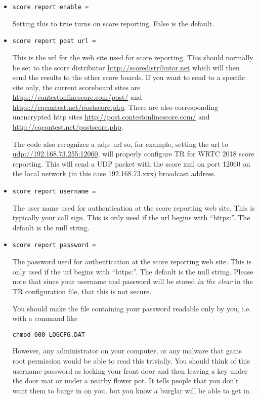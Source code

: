 \documentclass[12pt]{article}
\begin{document}
\begin{itemize}
\item
\begin{verbatim}
score report enable =
\end{verbatim}
Setting this to true
turns on score reporting.
False is the default.
\item
\begin{verbatim}
score report post url =
\end{verbatim}
This is the url for the web site used for score reporting. This should
normally be set to the score distributor
\url{http://scoredistributor.net} which will then
send the results to the other score boards.
If you want to send to a specific site only, the
current scoreboard sites are
\url{https://contestonlinescore.com/post/}
and
\url{https://cqcontest.net/postscore.php}. There are also
corresponding unencrypted http sites
\url{http://post.contestonlinescore.com/}
and
\url{http://cqcontest.net/postscore.php}.

The code also recognizes a udp: url so, for example, setting the
url to
\url{udp://192.168.73.255:12060}, will properly configure TR for
WRTC 2018 score reporting. This will send a UDP packet with the score xml
on port 12060 on the local network (in this case 192.168.73.xxx)
broadcast address.

\item
\begin{verbatim}
score report username =
\end{verbatim}
The user name used for authentication at the score reporting web site.
This is typically your call sign. This is only used if
the url begins with ``https:''. The default is the null string.

\item
\begin{verbatim}
score report password = 
\end{verbatim}
The password used for authentication at the score reporting web site.
This is only used if the url begins with ``https:''.
The default is the null string.
Please note that since your username and password will be stored {\em
in the clear} in the TR configuration file, that this is not
secure.

You should make the file containing your password readable only by you, i.e.
with a command like
\begin{verbatim}
chmod 600 LOGCFG.DAT
\end{verbatim}
However,
any administrator on your computer, or any malware that gains root permission
would be able to read this trivially.
You should think of this username password as locking your front door
and then leaving a key under the door mat or under a nearby flower pot.
It tells people that you don't want them to barge in on you, but you know
a burglar will be able to get in. 


\end{itemize}
\end{document}
